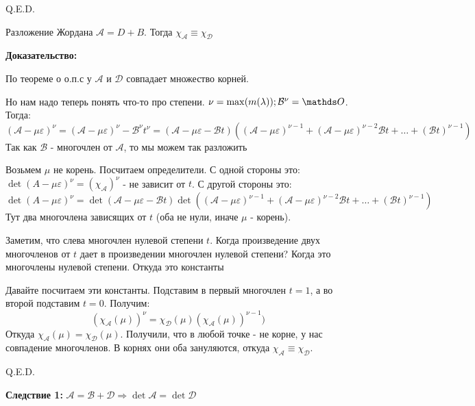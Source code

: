  \hfill Q.E.D.
















Разложение Жордана $\mathcal{A} = D + B$. Тогда
$\chi_{\mathcal{A}}\equiv \chi_\mathcal{D}$

\textbf{Доказательство:}

По теореме о о.п.с у $\mathcal{A}$ и $\mathcal{D}$ совпадает множество корней. 

Но нам надо теперь понять что-то про степени. $\nu = \max(m(\lambda)); \mathcal{B}^\nu = \zero$. Тогда:
$$(\mathcal{A}-\mu \varepsilon)^{\nu}=(\mathcal{A}-\mu \varepsilon)^{\nu} - \mathcal{B}^\nu t^\nu = (\mathcal{A-\mu \varepsilon-\mathcal{B}}t)((\mathcal{A}-\mu\varepsilon)^{\nu-1}+ (\mathcal{A}-\mu\varepsilon)^{\nu-2}\mathcal{B}t + \ldots + (\mathcal{B}t)^{\nu-1})$$
Так как $\mathcal{B}$ - многочлен от $\mathcal{A}$, то мы можем так разложить

Возьмем $\mu$ не корень. Посчитаем определители. С одной стороны это:
$\det (A-\mu \varepsilon)^\nu = (\chi_{\mathcal{A}})^\nu$  - не зависит от $t$.
С другой стороны это:
$$\det (A-\mu \varepsilon)^\nu = \det(\mathcal{A-\mu \varepsilon-\mathcal{B}}t)\det ((\mathcal{A}-\mu\varepsilon)^{\nu-1}+ (\mathcal{A}-\mu\varepsilon)^{\nu-2}\mathcal{B}t + \ldots + (\mathcal{B}t)^{\nu-1})$$
Тут два многочлена зависящих от $t$ (оба не нули, иначе $\mu$ - корень).

Заметим, что слева многочлен нулевой степени $t$. Когда произведение двух многочленов от $t$ дает в произведении многочлен нулевой степени? Когда это многочлены нулевой степени. Откуда это константы

Давайте посчитаем эти константы. Подставим в первый многочлен $t=1$, а во второй подставим $t=0$. Получим:
$$(\chi_{\mathcal{A}}(\mu))^{\nu} = \chi_{\mathcal{D}}(\mu) (\chi_{\mathcal{A}}(\mu))^{\nu-1})$$
Откуда $\chi_{\mathcal{A}}(\mu)=\chi_{\mathcal{D}}(\mu)$. Получили, что в любой точке - не корне, у нас совпадение многочленов. В корнях они оба зануляются, откуда $\chi_{\mathcal{A}} \equiv \chi_{\mathcal{D}}$.

\hfill Q.E.D.

\textbf{Следствие 1:} $\mathcal{A} = \mathcal{B} + \mathcal{D} \Rightarrow \det \mathcal{A} =\det \mathcal{D} $

